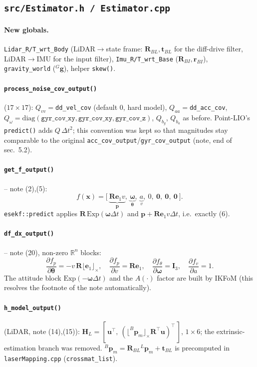 \documentclass[11pt,a4paper]{article}
\newcommand{\f}[1]{\texttt{#1}}
\newcommand{\R}{\mathbf{R}}
\newcommand{\p}{\mathbf{p}}
\newcommand{\w}{\bm{\omega}}
\newcommand{\e}{\mathbf{e}}
\newcommand{\g}{\mathbf{g}}
\newcommand{\skw}[1]{\lfloor #1\rfloor_\times}
\begin{document}
\subsection{\f{src/Estimator.h / Estimator.cpp}}

\paragraph{New globals.}
\f{Lidar\_R/T\_wrt\_Body} (LiDAR$\to$state frame: $\R_{BL},\mathbf t_{BL}$ for the
diff-drive filter, LiDAR$\to$IMU for the input filter),
\f{Imu\_R/T\_wrt\_Base} ($\R_{BI},\mathbf r_{BI}$), \f{gravity\_world} ($^G\g$),
helper \f{skew()}.

\paragraph{\f{process\_noise\_cov\_output()}} ($17\times17$):
$Q_{vv}=$\f{dd\_vel\_cov} (default 0, hard model), $Q_{aa}=$\f{dd\_acc\_cov},
$Q_{\omega}=\mathrm{diag}(\f{gyr\_cov\_xy},\f{gyr\_cov\_xy},\f{gyr\_cov\_z})$,
$Q_{b_g}$, $Q_{b_a}$ as before. Point-LIO's \f{predict()} adds $Q\,\Delta t^2$;
this convention was kept so that magnitudes stay comparable to the original
\f{acc\_cov\_output}/\f{gyr\_cov\_output} (note, end of sec.\ 5.2).

\paragraph{\f{get\_f\_output()}} -- note (2),(5):
\[
f(\mathbf x)=\big[\ \underbrace{\R\e_1 v}_{\p},\ \underbrace{\w}_{\bm\theta},\ \underbrace{a}_{v},\ 0,\ \mathbf 0,\ \mathbf 0,\ \mathbf 0\ \big].
\]
\f{esekf::predict} applies $\R\,\mathrm{Exp}(\w\Delta t)$ and $\p+\R\e_1v\Delta t$, i.e.\ exactly (6).

\paragraph{\f{df\_dx\_output()}} -- note (20), non-zero $\mathbb R^n$ blocks:
\[
\frac{\partial f_p}{\partial\bm\theta}=-v\,\R\skw{\e_1},\quad
\frac{\partial f_p}{\partial v}=\R\e_1,\quad
\frac{\partial f_\theta}{\partial\w}=\mathbf I_3,\quad
\frac{\partial f_v}{\partial a}=1 .
\]
The attitude block $\mathrm{Exp}(-\w\Delta t)$ and the $A(\cdot)$ factor are
built by IKFoM (this resolves the footnote of the note automatically).

\paragraph{\f{h\_model\_output()}} (LiDAR, note (14),(15)):
$\mathbf H_L=[\,\mathbf u^\top,\ (\skw{^B\p_m}\R^\top\mathbf u)^\top\,]$, $1\times6$; the
extrinsic-estimation branch was removed. $^B\p_m=\R_{BL}{}^L\p_m+\mathbf t_{BL}$ is
precomputed in \f{laserMapping.cpp} (\f{crossmat\_list}).
\end{document}
